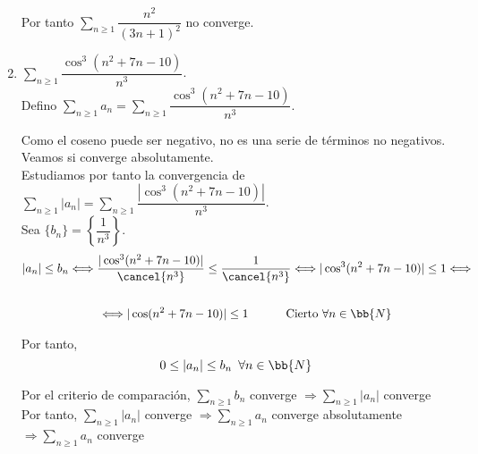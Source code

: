 \documentclass[12pt]{article}
\begin{document}
\begin{ejercicio}[3 puntos]
\begin{enumerate}
            Por tanto $\sum\limits_{n\geq 1} \dfrac{n^2}{(3n+1)^2}$ no converge.
            
            
            \item $\sum\limits_{n \geq 1} \dfrac{\cos^3(n^2 + 7n - 10)}{n^3}$.\\

            Defino $\sum\limits_{n\geq 1} a_n = \sum\limits_{n \geq 1} \dfrac{\cos^3(n^2 + 7n - 10)}{n^3}$.

            Como el coseno puede ser negativo, no es una serie de términos no negativos. Veamos si converge absolutamente. \\
            
            Estudiamos por tanto la convergencia de $\sum\limits_{n\geq 1} |a_n| = \sum\limits_{n \geq 1} \dfrac{|\cos^3(n^2 + 7n - 10)|}{n^3}$.\\

            Sea $\{b_n\}=\left\{ \dfrac{1}{n^3}\right\}$.
            \begin{gather*}
                |a_n|\leq b_n \Longleftrightarrow \dfrac{|\cos^3(n^2 + 7n - 10)|}{\cancel{n^3}} \leq \dfrac{1}{\cancel{n^3}} \Longleftrightarrow |\cos^3(n^2 + 7n - 10)|\leq 1 \Longleftrightarrow\\ \\
                \Longleftrightarrow |\cos(n^2 + 7n - 10)|\leq 1 \hspace{1cm} \text{ Cierto }\forall n \in \bb{N}
            \end{gather*}

            Por tanto,
            \[
                0\leq |a_n| \leq b_n \,\,\, \forall n \in \bb{N}
            \]

            Por el criterio de comparación, $\sum\limits_{n \geq 1}b_n$ converge $\Longrightarrow \sum\limits_{n\geq 1} |a_n| $ converge\\

            Por tanto, $\sum\limits_{n\geq 1} |a_n| $ converge $\Longrightarrow \sum\limits_{n\geq 1} a_n$ converge absolutamente $\Longrightarrow \sum\limits_{n\geq 1} a_n $ converge 

            
        \end{enumerate}
    \end{ejercicio}


     
\end{document}
